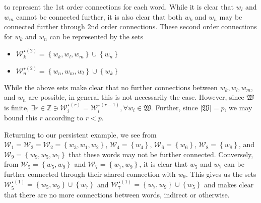 \documentclass{article}[12pt]
\newcommand{\Z}{\mathbb{Z}}
\begin{document}
\begin{flushleft}
to represent the 1st order connections for each word.  While it is clear that $w_l$ and $w_m$ cannot be connected further, it is also clear that both $w_k$ and $w_n$ may be connected further through 2nd order connections.  These second order connections for $w_k$ and $w_n$ can be represented by the sets

\begin{multicols}{2}
	\begin{itemize}
		\item $\mathcal{W}^{\star (2)}_k = \left\{ w_k, w_l, w_m \right\} \cup \left\{ w_n \right\}$
		\item $\mathcal{W}^{\star (2)}_n = \left\{ w_n, w_m, w_l \right\} \cup \left\{ w_k \right\}$
	\end{itemize}
\end{multicols}

While the above sets make clear that no further connections between $w_k, w_l, w_m$, and $w_n$ are possible, in general this is not necessarily the case.  However, since $\mathfrak{W}$ is finite, $\exists r \in \Z \ni \mathcal{W}^{\star (r)}_i = \mathcal{W}^{\star (r-1)}_i, \forall w_i \in \mathfrak{W}$.  Further, since $\left| \mathfrak{W} \right| = p$, we may bound this $r$ according to $r < p$. \newline

Returning to our persistent example, we see from $\mathcal{W}_1 = \mathcal{W}_2 = \mathcal{W}_2 = \left\{ w_3, w_1, w_2 \right\}$, $\mathcal{W}_4 = \left\{ w_4 \right\}$, $\mathcal{W}_6 = \left\{ w_6 \right\}$, $\mathcal{W}_8 = \left\{ w_8 \right\}$, and $\mathcal{W}_9 = \left\{ w_9, w_5, w_7 \right\}$ that these words may not be further connected.  Conversely, from $\mathcal{W}_5 = \left\{ w_5, w_9 \right\}$ and $\mathcal{W}_7 = \left\{ w_7, w_9 \right\}$, it is clear that $w_5$ and $w_7$ can be further connected through their shared connection with $w_9$.  This gives us the sets $\mathcal{W}^{\star (1)}_5 = \left\{ w_5, w_9 \right\} \cup \left\{ w_7 \right\}$ and $\mathcal{W}^{\star (1)}_7 = \left\{ w_7, w_9 \right\} \cup \left\{ w_5 \right\}$ and makes clear that there are no more connections between words, indirect or otherwise.







\end{flushleft}
\end{document}
